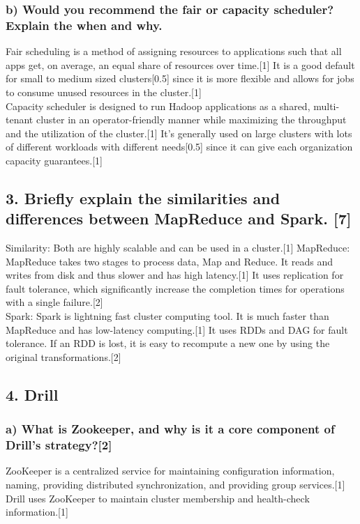 \documentclass[11pt,a4paper]{article}
\begin{document}
\subsubsection*{b) Would you recommend the fair or capacity scheduler? Explain the when and why.}
Fair scheduling is a method of assigning resources to applications such that all apps get, on average, an equal share of resources over time.[1] It is a good default for small to medium sized clusters[0.5] since it is more flexible and allows for jobs to consume unused resources in the cluster.[1] \\
Capacity scheduler is designed to run Hadoop applications as a shared, multi-tenant cluster in an operator-friendly manner while maximizing the throughput and the utilization of the cluster.[1] It's generally used on large clusters with lots of different workloads with different needs[0.5] since it can give each organization capacity guarantees.[1]

\subsection*{3. Briefly explain the similarities and differences between MapReduce and Spark. [7]}
Similarity: Both are highly scalable and can be used in a cluster.[1] 
MapReduce: MapReduce takes two stages to process data, Map and Reduce. It reads and writes from disk and thus slower and has high latency.[1] It uses replication for fault tolerance, which significantly increase the completion times for operations with a single failure.[2]\\
Spark: Spark is lightning fast cluster computing tool. It is much faster than MapReduce and has low-latency computing.[1] It uses RDDs and DAG for fault tolerance. If an RDD is lost, it is easy to recompute a new one by using the original transformations.[2]


\subsection*{4. Drill}
\subsubsection*{a) What is Zookeeper, and why is it a core component of Drill’s strategy?[2]}
ZooKeeper is a centralized service for maintaining configuration information, naming, providing distributed synchronization, and providing group services.[1]\\
Drill uses ZooKeeper to maintain cluster membership and health-check information.[1]
\end{document}
